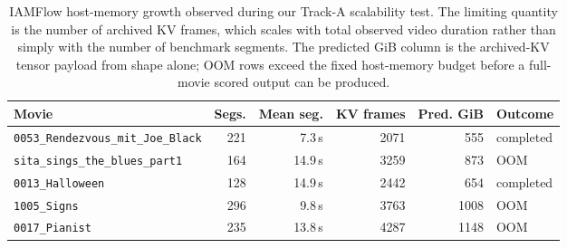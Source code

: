 \begin{table}[t]
\centering
\caption{IAMFlow host-memory growth observed during our Track-A scalability test. The limiting
quantity is the number of archived KV frames, which scales with total observed video duration rather
than simply with the number of benchmark segments. The predicted GiB column is the archived-KV tensor
payload from shape alone; OOM rows exceed the fixed host-memory budget before a full-movie scored
output can be produced.}
\label{tab:iamflow-host-memory}
\small
\setlength{\tabcolsep}{4pt}
\begin{tabular}{@{}lrrrrl@{}}
\toprule
Movie & Segs. & Mean seg. & KV frames & Pred. GiB & Outcome \\
\midrule
\texttt{0053\_Rendezvous\_mit\_Joe\_Black} & 221 & 7.3\,s  & 2071 & 555  & completed \\
\texttt{sita\_sings\_the\_blues\_part1}    & 164 & 14.9\,s & 3259 & 873  & OOM \\
\texttt{0013\_Halloween}                   & 128 & 14.9\,s & 2442 & 654  & completed \\
\texttt{1005\_Signs}                       & 296 & 9.8\,s  & 3763 & 1008 & OOM \\
\texttt{0017\_Pianist}                     & 235 & 13.8\,s & 4287 & 1148 & OOM \\
\bottomrule
\end{tabular}
\end{table}
